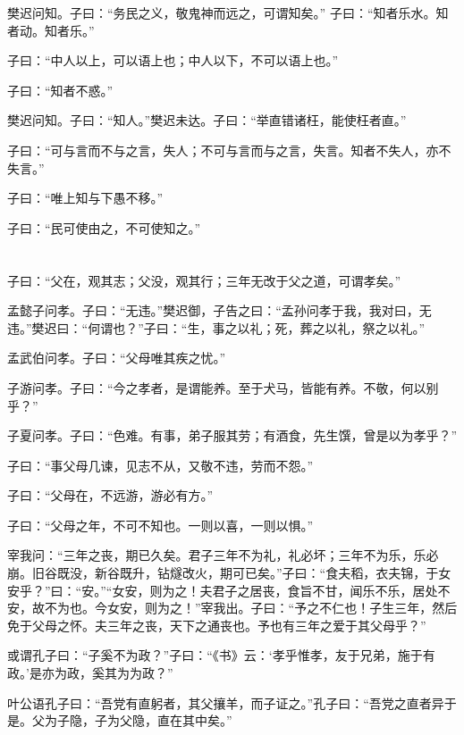 \documentclass[a5paper]{ctexbook}
\begin{document}
    樊迟问知。子曰：“务民之义，敬鬼神而远之，可谓知矣。”    子曰：“知者乐水。知者动。知者乐。”

    子曰：“中人以上，可以语上也；中人以下，不可以语上也。”

    子曰：“知者不惑。”

    樊迟问知。子曰：“知人。”樊迟未达。子曰：“举直错诸枉，能使枉者直。”

    子曰：“可与言而不与之言，失人；不可与言而与之言，失言。知者不失人，亦不失言。”

    子曰：“唯上知与下愚不移。”

    子曰：“民可使由之，不可使知之。”

    \chapter{}

    子曰：“父在，观其志；父没，观其行；三年无改于父之道，可谓孝矣。”

    孟懿子问孝。子曰：“无违。”樊迟御，子告之曰：“孟孙问孝于我，我对曰，无违。”樊迟曰：“何谓也？”子曰：“生，事之以礼；死，葬之以礼，祭之以礼。”

    孟武伯问孝。子曰：“父母唯其疾之忧。”

    子游问孝。子曰：“今之孝者，是谓能养。至于犬马，皆能有养。不敬，何以别乎？”

    子夏问孝。子曰：“色难。有事，弟子服其劳；有酒食，先生馔，曾是以为孝乎？”

    子曰：“事父母几谏，见志不从，又敬不违，劳而不怨。”

    子曰：“父母在，不远游，游必有方。”

    子曰：“父母之年，不可不知也。一则以喜，一则以惧。”

    宰我问：“三年之丧，期已久矣。君子三年不为礼，礼必坏；三年不为乐，乐必崩。旧谷既没，新谷既升，钻燧改火，期可已矣。”子曰：“食夫稻，衣夫锦，于女安乎？”曰：“安。”“女安，则为之！夫君子之居丧，食旨不甘，闻乐不乐，居处不安，故不为也。今女安，则为之！”宰我出。子曰：“予之不仁也！子生三年，然后免于父母之怀。夫三年之丧，天下之通丧也。予也有三年之爱于其父母乎？”

    或谓孔子曰：“子奚不为政？”子曰：“《书》云：‘孝乎惟孝，友于兄弟，施于有政。’是亦为政，奚其为为政？”

    叶公语孔子曰：“吾党有直躬者，其父攘羊，而子证之。”孔子曰：“吾党之直者异于是。父为子隐，子为父隐，直在其中矣。”

    \chapter{}
\end{document}
